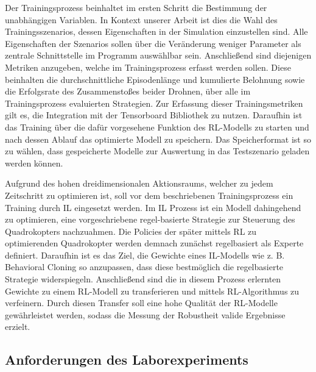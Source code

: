 Der Trainingsprozess beinhaltet im ersten Schritt die Bestimmung der unabhängigen Variablen. 
In Kontext unserer Arbeit ist dies die Wahl des Trainingsszenarios, dessen Eigenschaften in der Simulation einzustellen sind. %
Alle Eigenschaften der Szenarios sollen über die Veränderung weniger Parameter als zentrale Schnittstelle im Programm auswählbar sein.
Anschließend sind diejenigen Metriken anzugeben, welche im Trainingsprozess erfasst werden sollen.
Diese beinhalten die durchschnittliche Episodenlänge und kumulierte Belohnung sowie die Erfolgsrate des Zusammenstoßes beider Drohnen, über alle im Trainingsprozess evaluierten Strategien.
Zur Erfassung dieser Trainingsmetriken gilt es, die Integration mit der Tensorboard Bibliothek zu nutzen.
Daraufhin ist das Training über die dafür vorgesehene Funktion des RL-Modells zu starten und nach dessen Ablauf das optimierte Modell zu speichern.
Das Speicherformat ist so zu wählen, dass gespeicherte Modelle zur Auswertung in das Testszenario geladen werden können.

Aufgrund des hohen dreidimensionalen Aktionsraums, welcher zu jedem Zeitschritt zu optimieren ist, soll vor dem beschriebenen Trainingsprozess ein Training durch IL eingesetzt werden.
Im IL Prozess ist ein Modell dahingehend zu optimieren, eine vorgeschriebene regel-basierte Strategie zur Steuerung des Quadrokopters nachzuahmen. 
Die Policies der später mittels RL zu optimierenden Quadrokopter werden demnach zunächst regelbasiert als Experte definiert. 
Daraufhin ist es das Ziel, die Gewichte eines IL-Modells wie z. B. Behavioral Cloning so anzupassen, dass diese bestmöglich die regelbasierte Strategie widerspiegeln. %
Anschließend sind die in diesem Prozess erlernten Gewichte zu einem RL-Modell zu transferieren und mittels RL-Algorithmus zu verfeinern. %
Durch diesen Transfer soll eine hohe Qualität der RL-Modelle gewährleistet werden, sodass die Messung der Robustheit valide Ergebnisse erzielt. %

\subsection{Anforderungen des Laborexperiments}

